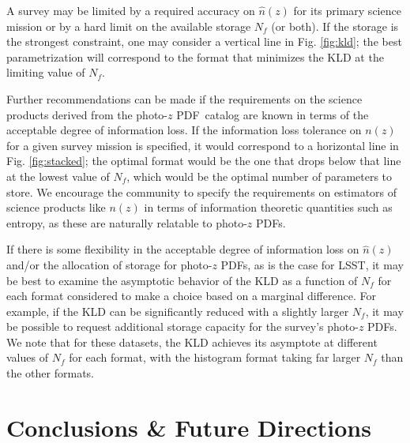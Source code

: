 \documentclass[\docopts]{\docclass}
\newcommand{\pz}{photo-$z$ PDF}
\begin{document}
A survey may be limited by a required accuracy on $\hat{n}(z)$ for its primary 
science mission or by a hard limit on the available storage $N_{f}$ (or both).  
If the storage is the strongest constraint, one may consider a vertical line in 
Fig. \ref{fig:kld}; the best parametrization will correspond to the format that 
minimizes the KLD at the limiting value of $N_{f}$.

Further recommendations can be made if the requirements on the science products 
derived from the \pz\ catalog are known in terms of the acceptable degree of 
information loss.  If the information loss tolerance on $n(z)$ for a given 
survey mission is specified, it would correspond to a horizontal line in Fig. 
\ref{fig:stacked}; the optimal format would be the one that drops below that 
line at the lowest value of $N_{f}$, which would be the optimal number of 
parameters to store.  We encourage the community to specify the requirements on 
estimators of science products like $n(z)$ in terms of information theoretic 
quantities such as entropy, as these are naturally relatable to \pz s.

If there is some flexibility in the acceptable degree of information loss on 
$\hat{n}(z)$ and/or the allocation of storage for \pz s, as is the case for 
LSST, it may be best to examine the asymptotic behavior of the KLD as a 
function of $N_{f}$ for each format considered to make a choice based on a 
marginal difference.  For example, if the KLD can be significantly reduced with 
a slightly larger $N_{f}$, it may be possible to request additional storage 
capacity for the survey's \pz s.  We note that for these datasets, the KLD 
achieves its asymptote at different values of $N_{f}$ for each format, with the 
histogram format taking far larger $N_{f}$ than the other formats.





\section{Conclusions \& Future Directions}
\label{sec:conclusions}
\end{document}

